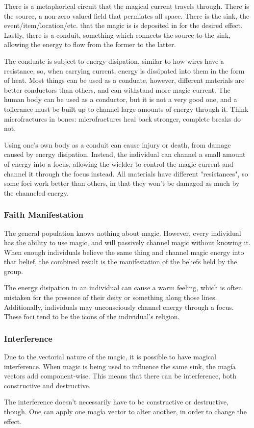 \documentclass[
a4paper,
10pt,
twoside,
]{article}
\begin{document}
There is a metaphorical circuit that the magical current travels through.
There is the source, a non-zero valued field that permiates all space.
There is the sink, the event/item/location/etc. that the magic is is deposited in for the desired effect.
Lastly, there is a conduit, something which connects the source to the sink, allowing the energy to flow from the former to the latter.


The conduate is subject to energy disipation, similar to how wires have a resistance, so, when carrying current, energy is dissipated into them in the form of heat.
Most things can be used as a conduate, however, different materials are better conductors than others, and can withstand more magic current.
The human body can be used as a conductor, but it is not a very good one, and a tollerance must be built up to channel large amounts of energy through it.
Think microfractures in bones: microfractures heal back stronger, complete breaks do not.

Using one's own body as a conduit can cause injury or death, from damage caused by energy disipation.
Instead, the individual can channel a small amount of energy into a focus, allowing the wielder to control the magic current and channel it through the focus instead.
All materials have different "resistances", so some foci work better than others, in that they won't be damaged as much by the channeled energy.

\subsubsection{Faith Manifestation}

The general population knows nothing about magic.
However, every individual has the ability to use magic, and will passively channel magic without knowing it.
When enough individuals believe the same thing and channel magic energy into that belief, the combined result is the manifestation of the beliefs held by the group.

The energy disipation in an individual can cause a warm feeling, which is often mistaken for the presence of their deity or something along those lines.
Additionally, individuals may unconsciously channel energy through a focus.
These foci tend to be the icons of the individual's religion.

\subsubsection{Interference}

Due to the vectorial nature of the magic, it is possible to have magical interference.
When magic is being used to influence the same sink, the magía vectors add component-wise.
This means that there can be interference, both constructive and destructive.

The interference doesn't necessarily have to be constructive or destructive, though.
One can apply one magía vector to alter another, in order to change the effect.



\stopmcols
\end{document}
